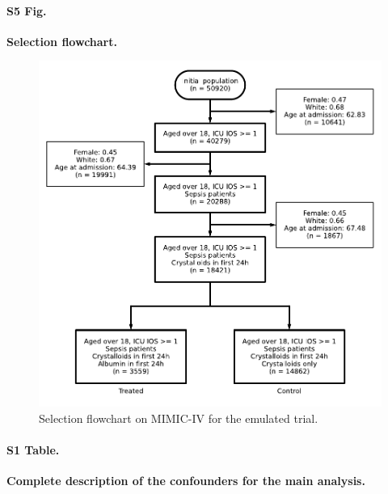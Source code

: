 \documentclass[10pt,letterpaper]{article}
\begin{document}
\paragraph*{S5 Fig.}
\label{apd:selection_flowchart}
{\bf Selection flowchart.}

\begin{figure}[!htb]
  \centering
  \includegraphics[width=0.7\linewidth]{img_supp/albumin_for_sepsis__obs_1d__flowchart_albumin_for_sepsis.pdf}
  \caption{Selection flowchart on MIMIC-IV for the emulated trial.}\label{fig:selection_flowchart}
\end{figure}
\clearpage


\paragraph*{S1 Table.}
\label{apd:albumin_for_sepsis:table1_complete}
{\bf Complete description of the confounders for the main analysis.}
\begin{table}[h!]
  \resizebox{\textwidth}{!}{%
    
  }\\
  \caption{Characteristics of the trial population measured on the first 24
    hours of ICU stay. \\
    Risk scores (AKI, SOFA, SAPSII) and lactates have been summarized as the
    maximum value during the 24 hour period for each stay. Total cumulative urine output has
    been computed. Other variables have been aggregated by taking mean during
    the 24 hour period.}\label{apd:table:albumin_for_sepsis:table1_complete}
\end{table}
\clearpage
\end{document}
